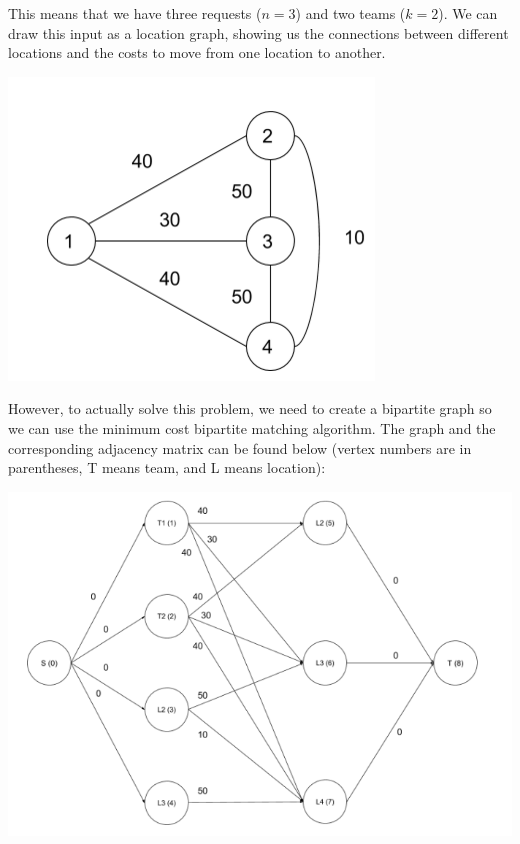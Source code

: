 \documentclass[12pt]{article}
\begin{document}
This means that we have three requests ($n = 3$) and two teams ($k = 2$).
We can draw this input as a location graph, showing us the connections
between different locations and the costs to move from one location
to another.

\begin{center}
    \includegraphics[scale=0.5]{catering1}
\end{center}

However, to actually solve this problem, we need to create a bipartite
graph so we can use the minimum cost bipartite matching algorithm. The
graph and the corresponding adjacency matrix can be found below (vertex
numbers are in parentheses, T means team, and L means location):

\begin{center}
    \includegraphics[scale=0.5]{catering_example_graph}
\end{center}
\end{document}
